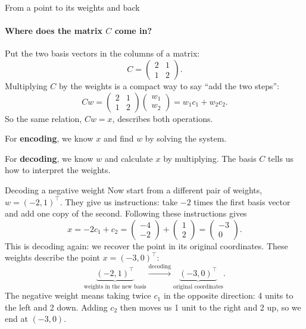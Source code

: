 \documentclass[a4paper,12pt,oneside]{report}
\begin{document}
\begin{framedexample}{From a point to its weights and back}
\paragraph{Where does the matrix $C$ come in?}
Put the two basis vectors in the columns of a matrix:
\[
  C=\begin{pmatrix}2&1\\1&2\end{pmatrix}.
\]
Multiplying $C$ by the weights is a compact way to say
``add the two steps'':
\[
  Cw=
  \begin{pmatrix}2&1\\1&2\end{pmatrix}
  \begin{pmatrix}w_1\\w_2\end{pmatrix}
  =w_1c_1+w_2c_2.
\]
So the same relation, $Cw=x$, describes both operations.

For \textbf{encoding}, we know $x$ and find $w$ by solving the system.

For \textbf{decoding}, we know $w$ and calculate $x$ by multiplying.
The basis $C$ tells us how to interpret the weights.

\end{framedexample}

\begin{framedexample}{Decoding a negative weight}
Now start from a different pair of weights, $w=(-2,1)^\top$.
They give us instructions: take $-2$ times the first basis vector and
add one copy of the second. Following these instructions gives
\[
  x=-2c_1+c_2
   =\begin{pmatrix}-4\\-2\end{pmatrix}
    +\begin{pmatrix}1\\2\end{pmatrix}
   =\begin{pmatrix}-3\\0\end{pmatrix}.
\]
This is decoding again: we recover the point in its original
coordinates. These weights describe the point $x=(-3,0)^\top$:
\[
  \underbrace{(-2,1)^\top}_{\text{weights in the new basis}}
  \xrightarrow{\text{decoding}}
  \underbrace{(-3,0)^\top}_{\text{original coordinates}}.
\]
The negative weight means taking twice $c_1$ in the opposite direction:
4 units to the left and 2 down. Adding $c_2$ then moves us 1 unit to
the right and 2 up, so we end at $(-3,0)$.
\end{framedexample}
\end{document}
